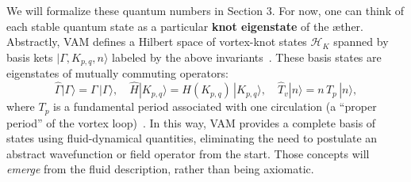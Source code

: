 \documentclass[a4paper,12pt]{article}
\begin{document}
    We will formalize these quantum numbers in Section 3. For now, one can think of each stable quantum state as a particular \textbf{knot eigenstate} of the æther. Abstractly, VAM defines a Hilbert space of vortex-knot states $\mathcal{H}_K$ spanned by basis kets $|\Gamma, K_{p,q}, n\rangle$ labeled by the above invariants~\cite{reference_40}. These basis states are eigenstates of mutually commuting operators:
    \[
        \hat{\Gamma}|\Gamma\rangle = \Gamma\,|\Gamma\rangle, \quad
        \hat{H} |K_{p,q}\rangle = H(K_{p,q})\,|K_{p,q}\rangle, \quad
        \hat{T}_v|n\rangle = n\,T_p\,|n\rangle,
    \]
    where $T_p$ is a fundamental period associated with one circulation (a “proper period” of the vortex loop)~\cite{reference_41}. In this way, VAM provides a complete basis of states using fluid-dynamical quantities, eliminating the need to postulate an abstract wavefunction or field operator from the start. Those concepts will \emph{emerge} from the fluid description, rather than being axiomatic.
\end{document}
